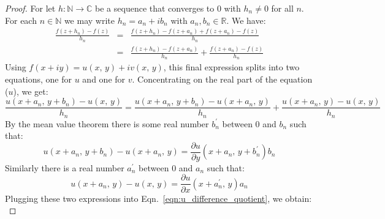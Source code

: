 \documentclass{article}
\theoremstyle{definition}
\begin{document}
        \begin{proof}
            For let $h:\mathbb{N}\rightarrow\mathbb{C}$ be a sequence
            that converges to $0$ with $h_{n}\ne{0}$ for all $n$.
            For each $n\in\mathbb{N}$ we may write $h_{n}=a_{n}+ib_{n}$
            with $a_{n},b_{n}\in\mathbb{R}$. We have:
            \begin{equation}
                \begin{array}{rcl}
                    \displaystyle
                    \frac{f(z+h_{n})-f(z)}{h_{n}}
                    &=&
                    \displaystyle
                    \frac{f(z+h_{n})-f(z+a_{n})+f(z+a_{n})-f(z)}{h_{n}}\\[1.5em]
                    &=&
                    \displaystyle
                    \frac{f(z+h_{n})-f(z+a_{n})}{h_{n}}
                        +\frac{f(z+a_{n})-f(z)}{h_{n}}
                \end{array}
            \end{equation}
            Using $f(x+iy)=u(x,\,y)+iv(x,\,y)$, this final expression splits
            into two equations, one for $u$ and one for $v$. Concentrating
            on the real part of the equation ($u$), we get:
            \begin{equation}
                \label{eqn:u_difference_quotient}
                \frac{u(x+a_{n},\,y+b_{n})-u(x,\,y)}{h_{n}}
                =
                \frac{u(x+a_{n},\,y+b_{n})-u(x+a_{n},\,y)}{h_{n}}
                    +\frac{u(x+a_{n},\,y)-u(x,\,y)}{h_{n}}
            \end{equation}
            By the mean value theorem there is some real number
            ${b}_{n}^{\prime}$ between $0$ and $b_{n}$ such that:
            \begin{equation}
                u(x+a_{n},\,y+b_{n})-u(x+a_{n},\,y)
                =\frac{\partial{u}}{\partial{y}}
                \left(x+a_{n},\,y+b_{n}^{\prime}\right)b_{n}
            \end{equation}
            Similarly there is a real number $a_{n}^{\prime}$ between $0$ and
            $a_{n}$ such that:
            \begin{equation}
                u(x+a_{n},\,y)-u(x,\,y)
                =\frac{\partial{u}}{\partial{x}}
                \left(x+a_{n}^{\prime},\,y\right)a_{n}
            \end{equation}
            Plugging these two expressions into
            Eqn.~\ref{eqn:u_difference_quotient}, we obtain:
            \begin{equation}

\end{equation}
\end{proof}
\end{document}
